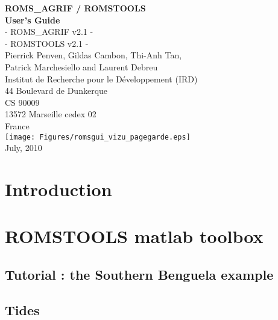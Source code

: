 \documentclass[11pt]{book}
\begin{document}
\thispagestyle{empty}
\pagestyle{plain}
\begin{center}
\vspace{3 cm}
{\huge \bf ROMS\_AGRIF / ROMSTOOLS}\\
\vspace{0.5 cm}
{\huge \bf User's Guide }\\
\vspace{1.0cm}
{\large - ROMS\_AGRIF v2.1 -} \\
{\large - ROMSTOOLS v2.1 -} \\
\vspace{0.5 cm}
{\Large Pierrick Penven, Gildas Cambon, Thi-Anh Tan,  \\ 
Patrick Marchesiello and Laurent Debreu}\\ 
\vspace{1 cm}
{\Large Institut de Recherche pour le D\'eveloppement (IRD)}\\
\vspace{0.5 cm}
{\large 44 Boulevard de Dunkerque} \\
{\large CS 90009} \\
{\large 13572 Marseille cedex 02} \\
{\Large France} \\
\vspace{1.5cm}
\texttt{[image: Figures/romsgui\_vizu\_pagegarde.eps]}
\vspace{1cm} \\
{July, 2010}
\end{center}
\chapter*{Introduction}

\newpage
\tableofcontents
\newpage
\chapter{ROMSTOOLS matlab toolbox}



\section{Tutorial : the Southern Benguela example}


\section{Tides}

\end{document}
